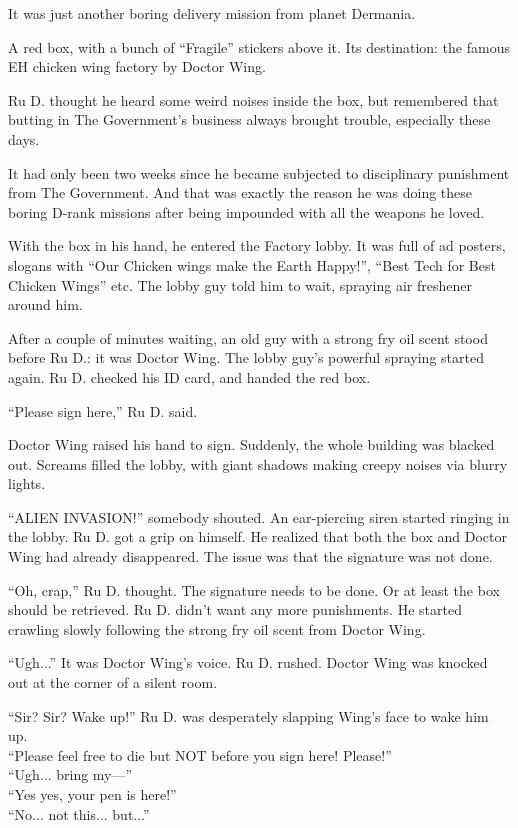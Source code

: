 
It was just another boring delivery mission from planet Dermania. 

A red box, with a bunch of ``Fragile'' stickers above it. Its destination: the famous EH chicken wing factory by Doctor Wing. 

Ru D. thought he heard some weird noises inside the box, but remembered that butting in The Government's business always brought trouble, especially these days. 

It had only been two weeks since he became subjected to disciplinary punishment from The Government. And that was exactly the reason he was doing these boring D-rank missions after being impounded with all the weapons he loved. 

With the box in his hand, he entered the Factory lobby. It was full of ad posters, slogans with ``Our Chicken wings make the Earth Happy!'', ``Best Tech for Best Chicken Wings'' etc. The lobby guy told him to wait, spraying air freshener around him.

After a couple of minutes waiting, an old guy with a strong fry oil scent stood before Ru D.: it was Doctor Wing. The lobby guy's powerful spraying started again. Ru D. checked his ID card, and handed the red box. 

``Please sign here,'' Ru D. said.

Doctor Wing raised his hand to sign. Suddenly, the whole building was blacked out. Screams filled the lobby, with giant shadows making creepy noises via blurry lights. 

``ALIEN INVASION!'' somebody shouted. An ear-piercing siren started ringing in the lobby. Ru D. got a grip on himself. He realized that both the box and Doctor Wing had already disappeared. The issue was that the signature was not done. 

``Oh, crap,'' Ru D. thought.
The signature needs to be done. Or at least the box should be retrieved. Ru D. didn't want any more punishments. He started crawling slowly following the strong fry oil scent from Doctor Wing. 

``Ugh...'' It was Doctor Wing's voice. Ru D. rushed. Doctor Wing was knocked out at the corner of a silent room.

``Sir? Sir? Wake up!'' Ru D. was desperately slapping Wing's face to wake him up. \\
``Please feel free to die but NOT before you sign here! Please!'' \\
``Ugh... bring my—'' \\
``Yes yes, your pen is here!'' \\
``No... not this... but...'' 


